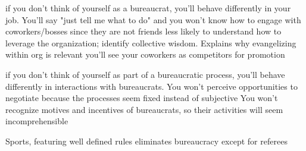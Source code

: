 if you don't think of yourself as a bureaucrat, you'll behave differently in your job.
You'll say "just tell me what to do" and you won't know how to engage with coworkers/bosses since they are not friends
less likely to understand how to leverage the organization; identify collective wisdom. Explains why evangelizing within org is relevant
you'll see your coworkers as competitors for promotion

if you don't think of yourself as part of a bureaucratic process, you'll behave differently in interactions with bureaucrats. 
You won't perceive opportunities to negotiate because the processes seem fixed instead of subjective
You won't recognize motives and incentives of bureaucrats, so their activities will seem incomprehensible




Sports, featuring well defined rules eliminates bureaucracy except for referees